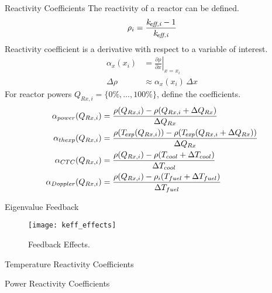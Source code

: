 \begin{frame}{Reactivity Coefficients}
  The reactivity of a reactor can be defined.
  \begin{equation}
    \label{eq:reactivity}
    \rho_i = \frac{k_{\!\mbox{\scriptsize \em eff,{i}}} - 1}{k_{\!\mbox{\scriptsize \em eff,{i}}}}
  \end{equation}
  Reactivity coefficient is a derivative with respect to a variable of interest.
  \begin{align}
    \label{eq:reactivity_coefficient}
    \alpha_x(x_i) &= \left. \frac{\partial \rho}{\partial x} \right|_{x=x_i} \\
    \Delta \rho &\approx \alpha_x(x_i) \, \Delta x
  \end{align}
  For reactor powers $Q_{Rx,i} = \{0\%,\ldots,100\%\}$, define the coefficients.
  \begin{align}
    \label{eq:power_reactivity_coefficient}
    \alpha_{power}(Q_{Rx,i}) &= \frac{\rho(Q_{Rx,i}) - \rho(Q_{Rx,i} + 
      \Delta Q_{Rx})} {\Delta Q_{Rx}} \\
    \label{eq:thermal_expansion_reactivity_coefficient}
    \alpha_{thexp}(Q_{Rx,i}) &= \frac{\rho({T_{\!\mbox{\scriptsize \em exp}}}(Q_{Rx,i})) -
      \rho({T_{\!\mbox{\scriptsize \em exp}}}(Q_{Rx,i} + \Delta Q_{Rx}))}{\Delta Q_{Rx}} \\
    \label{eq:doppler_reactivity_coefficient}
    \alpha_{CTC}(Q_{Rx,i}) &= \frac{\rho(Q_{Rx,i}) - \rho(T_{cool} + 
      \Delta T_{cool})} {\Delta T_{cool}} \\
    \label{eq:coolant_temperature_reactivity_coefficient}
    \alpha_{Doppler}(Q_{Rx,i}) &= \frac{\rho(Q_{Rx,i}) - \rho_i(T_{fuel} + 
      \Delta T_{fuel})} {\Delta T_{fuel}}
  \end{align}
\end{frame}

\begin{frame}{Eigenvalue Feedback}
  \begin{figure}
    \centering
    \texttt{[image: keff\_effects]}
    \caption{\keff Feedback Effects.}
    \label{fig:keff_effects}
  \end{figure}
\end{frame}

\begin{frame}{Temperature Reactivity Coefficients}
  \begin{figure}
    \centering
    \hspace*{\fill}
  \end{figure}
\end{frame}

\begin{frame}{Power Reactivity Coefficients}
  \begin{figure}
    \centering
    \hspace*{\fill}
  \end{figure}
\end{frame}

